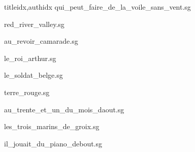 \documentclass[12pt]{article}
\begin{document}
\begin{songs}{titleidx,authidx}
{qui_peut_faire_de_la_voile_sans_vent.sg}


{red_river_valley.sg}


{au_revoir_camarade.sg}


{le_roi_arthur.sg}


{le_soldat_belge.sg}


{terre_rouge.sg}


{au_trente_et_un_du_mois_daout.sg}


{les_trois_marins_de_groix.sg}


{il_jouait_du_piano_debout.sg}


\end{songs}
\end{document}
